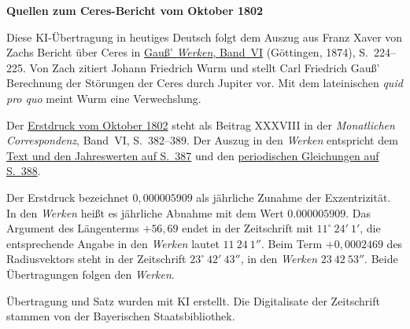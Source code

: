 \clearpage\thispagestyle{empty}
\begin{center}\textbf{Quellen zum Ceres-Bericht vom Oktober 1802}\end{center}
\noindent Diese KI-Übertragung in heutiges Deutsch folgt dem Auszug aus Franz Xaver von Zachs Bericht über Ceres in \href{https://gdz.sub.uni-goettingen.de/id/PPN236007467}{Gauß’ \textit{Werken}, Band~VI} (Göttingen, 1874), S.~224--225. Von Zach zitiert Johann Friedrich Wurm und stellt Carl Friedrich Gauß’ Berechnung der Störungen der Ceres durch Jupiter vor. Mit dem lateinischen \textit{quid pro quo} meint Wurm eine Verwechslung.
\par\smallskip\noindent Der \href{https://api.digitale-sammlungen.de/iiif/image/v2/bsb10538598_00392/full/1450,/0/default.jpg}{Erstdruck vom Oktober 1802} steht als Beitrag XXXVIII in der \textit{Monatlichen Correspondenz}, Band~VI, S.~382--389. Der Auszug in den \textit{Werken} entspricht dem \href{https://api.digitale-sammlungen.de/iiif/image/v2/bsb10538598_00397/full/1450,/0/default.jpg}{Text und den Jahreswerten auf S.~387} und den \href{https://api.digitale-sammlungen.de/iiif/image/v2/bsb10538598_00398/full/1450,/0/default.jpg}{periodischen Gleichungen auf S.~388}.
\par\smallskip\noindent Der Erstdruck bezeichnet \(0{,}000005909\) als jährliche Zunahme der Exzentrizität. In den \textit{Werken} heißt es jährliche Abnahme mit dem Wert \(0.000005909\). Das Argument des Längenterms \(+56{,}69\) endet in der Zeitschrift mit \(11^\circ\ 24'\ 1'\), die entsprechende Angabe in den \textit{Werken} lautet \(11\ 24\ 1''\). Beim Term \(+0{,}0002469\) des Radiusvektors steht in der Zeitschrift \(23^\circ\ 42'\ 43''\), in den \textit{Werken} \(23\ 42\ 53''\). Beide Übertragungen folgen den \textit{Werken}.
\par\smallskip\noindent Übertragung und Satz wurden mit KI erstellt. Die Digitalisate der Zeitschrift stammen von der Bayerischen Staatsbibliothek.
\clearpage
